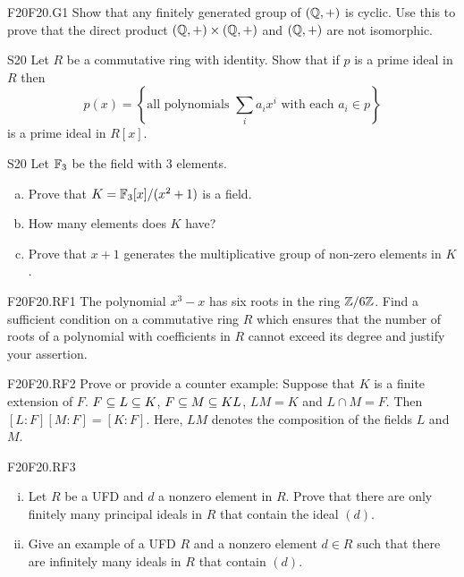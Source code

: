 \documentclass[../AlgebraQualSolutions.tex]{subfiles}
\begin{document}
\begin{prob}{F20}{F20.G1}
Show that any finitely generated group of $(\mathbb{Q},+)$ is cyclic. Use this to prove that the direct product $(\mathbb{Q},+) \times (\mathbb{Q},+)$ and $(\mathbb{Q},+)$ are not isomorphic.
\end{prob}

\begin{prob}{S20}{}
Let $R$ be a commutative ring with identity. Show that if $p$ is a prime ideal in $R$ then
	\[p(x) = \left\{\textrm{all polynomials } \sum_i a_ix^i \textrm{ with each } a_i \in p \right\} \]
is a prime ideal in $R[x]$.
\end{prob}

\begin{prob}{S20}{}
Let $\mathbb{F}_3$ be the field with 3 elements.
\begin{enumerate}[(a)]
\item Prove that $K = \mathbb{F}_3[x]/(x^2 + 1)$ is a field.
\item How many elements does $K$ have?
\item Prove that $x+1$ generates the multiplicative group of non-zero elements in $K$.
\end{enumerate}
\end{prob}


\begin{prob}{F20}{F20.RF1}
The polynomial $x^3 - x$ has six roots in the ring $\mathbb{Z}/6\mathbb{Z}$. Find a sufficient condition on a commutative ring $R$ which ensures that the number of roots of a polynomial with coefficients in $R$ cannot exceed its degree and justify your assertion.
\end{prob}

\begin{prob}{F20}{F20.RF2}
Prove or provide a counter example: Suppose that $K$ is a finite extension of $F$. $F \subseteq L \subseteq K$, $F \subseteq M \subseteq KL$, $LM = K$ and $L \cap M = F$. Then $[L:F][M:F] = [K:F]$. Here, $LM$ denotes the composition of the fields $L$ and $M$.
\end{prob}

\begin{prob}{F20}{F20.RF3}
	\begin{enumerate}[(i)]
	\item Let $R$ be a UFD and $d$ a nonzero element in $R$. Prove that there are only finitely many principal ideals  in $R$ that contain the ideal $(d)$.
	\item Give an example of a UFD $R$ and a nonzero element $d \in R$ such that there are infinitely many ideals in $R$ that contain $(d)$.
	\end{enumerate}
\end{prob}
\end{document}
